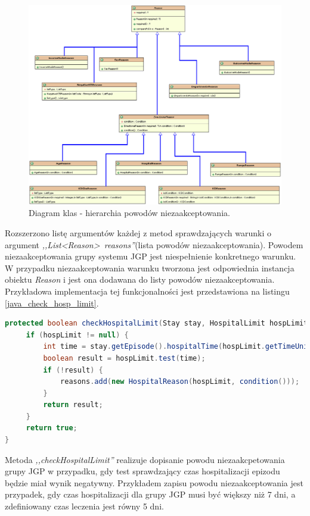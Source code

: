 \begin{figure}[!ht]
\centering
\includegraphics[scale=0.4]{images/reason-classes2}
\caption[Diagram aktywności]{Diagram klas - hierarchia powodów niezaakceptowania.}
\label{img:diagram_class_reason}
\end{figure}

\newpage
Rozszerzono listę argumentów każdej z metod sprawdzających warunki o argument \mbox{\textit{,,List<Reason> reasons''}}(lista powodów niezaakceptowania). Powodem niezaakceptowania grupy systemu JGP jest niespełnienie konkretnego warunku.
W przypadku niezaakceptowania warunku tworzona jest odpowiednia instancja obiektu \textit{Reason} i jest ona  dodawana do listy powodów niezaakceptowania. Przykładowa implementacja tej funkcjonalności jest przedstawiona na listingu \ref{java_check_hosp_limit}.

\begin{lstlisting}[language=Java,caption={Metoda sprawdzająca warunek na czas hospitalizacji.},label=java_check_hosp_limit]
protected boolean checkHospitalLimit(Stay stay, HospitalLimit hospLimit, List<Reason> reasons) {
     if (hospLimit != null) {
         int time = stay.getEpisode().hospitalTime(hospLimit.getTimeUnit());
         boolean result = hospLimit.test(time);
         if (!result) {
             reasons.add(new HospitalReason(hospLimit, condition()));
         }
         return result;
     }
     return true;
}
\end{lstlisting}

Metoda \textit{,,checkHospitalLimit''} realizuje dopisanie powodu niezaakcpetowania grupy JGP w przypadku, gdy test sprawdzający czas hospitalizacji epizodu będzie miał wynik negatywny. Przykładem zapisu powodu niezaakceptowania jest przypadek, gdy czas hospitalizacji dla grupy JGP musi być większy niż 7 dni, a zdefiniowany czas leczenia jest równy 5 dni.

